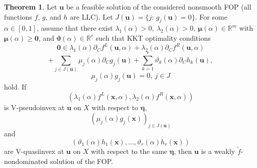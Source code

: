 \documentclass{article}
\theoremstyle{definition}
\newtheorem{theorem}[maar]{Theorem}
\begin{document}
\begin{theorem}\label{4.3.1} Let $\boldsymbol u$ be a feasible solution of the considered nonsmooth FOP (all functions $f$, $g$, and $h$ are LLC).
Let $J(\boldsymbol{u}) = \{j\!:\,g_j(\boldsymbol{u}) = 0\}$. For some $\alpha\in[0,1]$, assume that there exist $\lambda_1( \alpha) > 0,\  \lambda_2( \alpha) > 0,\  {\boldsymbol \mu}( \alpha) \in \mathbb  R^{m}$ with
${\boldsymbol\mu}(\alpha)\ge \boldsymbol 0$, and $ {\boldsymbol \vartheta}( \alpha) \in \mathbb R^r$ such that KKT optimality conditions
$$\boldsymbol 0 \in  \lambda_1( \alpha)\partial_Cf^L(\boldsymbol u,  \alpha) +  \lambda_2( \alpha)\partial_Cf^R(\boldsymbol u,  \alpha)$$
$$+ \sum_{j\in J(\boldsymbol{u})}  \mu_j( \alpha)\partial_Cg_j(\boldsymbol u) + \sum_{k=1}^r  \vartheta_k( \alpha)\partial_Ch_k(\boldsymbol u),$$
$$ \mu_j( \alpha)g_j(\boldsymbol u) = 0,\ j\in J$$
hold. If $$( \lambda_1( \alpha) f^L(\boldsymbol x,  \alpha),  \lambda_2( \alpha) f^R(\boldsymbol x,  \alpha))$$ is V-pseudoinvex at $\boldsymbol u$ on $X$ with respect to $\boldsymbol \eta$, 
$$( \mu_j( \alpha) g_j(\boldsymbol x))_{j \in J(\boldsymbol{u})}$$
and $$( \vartheta_1( \alpha) h_1(\boldsymbol x),\dots,  \vartheta_r( \alpha) h_r(\boldsymbol x))$$ are V-quasiinvex at $\boldsymbol u$ on $X$ with respect to the same $\boldsymbol \eta$, then $\boldsymbol u$ is a weakly $\tilde f$-nondominated solution of the FOP.
\end{theorem}
\end{document}

